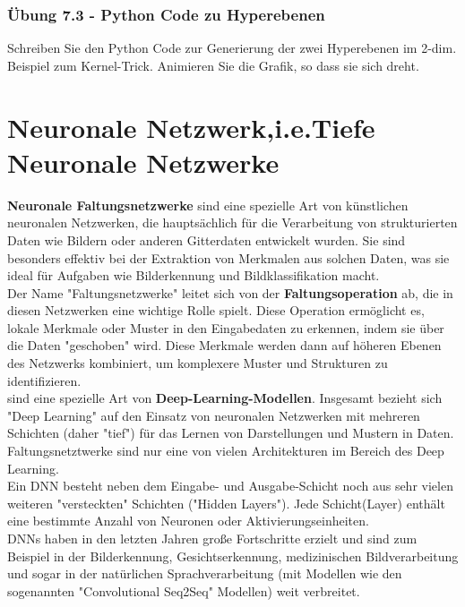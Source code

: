 \documentclass[12pt]{article}
\begin{document}
\subsubsection{Übung 7.3 - Python Code zu Hyperebenen}
Schreiben Sie den Python Code zur Generierung der zwei Hyperebenen im 2-dim. Beispiel zum Kernel-Trick. Animieren Sie die Grafik, so dass sie sich dreht. 

\newpage

\section{Neuronale Netzwerk,i.e.Tiefe Neuronale Netzwerke }

\textbf{Neuronale Faltungsnetzwerke} sind eine spezielle Art von künstlichen neuronalen Netzwerken, die hauptsächlich für die Verarbeitung von strukturierten Daten wie Bildern oder anderen Gitterdaten entwickelt wurden. Sie sind besonders effektiv bei der Extraktion von Merkmalen aus solchen Daten, was sie ideal für Aufgaben wie Bilderkennung und Bildklassifikation macht.
\\
Der Name "Faltungsnetzwerke" leitet sich von der \textbf{Faltungsoperation} ab, die in diesen Netzwerken eine wichtige Rolle spielt. Diese Operation ermöglicht es, lokale Merkmale oder Muster in den Eingabedaten zu erkennen, indem sie über die Daten "geschoben" wird. Diese Merkmale werden dann auf höheren Ebenen des Netzwerks kombiniert, um komplexere Muster und Strukturen zu identifizieren.\\
{\color{blue}{Faltungsnetzwerke)}} sind eine spezielle Art von \textbf {Deep-Learning-Modellen}. Insgesamt bezieht sich "Deep Learning" auf den Einsatz von neuronalen Netzwerken mit mehreren Schichten (daher "tief") für das Lernen von Darstellungen und Mustern in Daten. Faltungsnetztwerke sind nur eine von vielen Architekturen im Bereich des Deep Learning.\\
Ein DNN besteht neben dem Eingabe- und Ausgabe-Schicht noch aus sehr vielen weiteren "versteckten" Schichten ("Hidden Layers"). Jede Schicht(Layer) enthält eine bestimmte Anzahl von Neuronen oder Aktivierungseinheiten.\\
DNNs haben in den letzten Jahren große Fortschritte erzielt und sind zum Beispiel in der Bilderkennung, Gesichtserkennung, medizinischen Bildverarbeitung und sogar in der natürlichen Sprachverarbeitung (mit Modellen wie den sogenannten "Convolutional Seq2Seq" Modellen) weit verbreitet.\\
\end{document}
